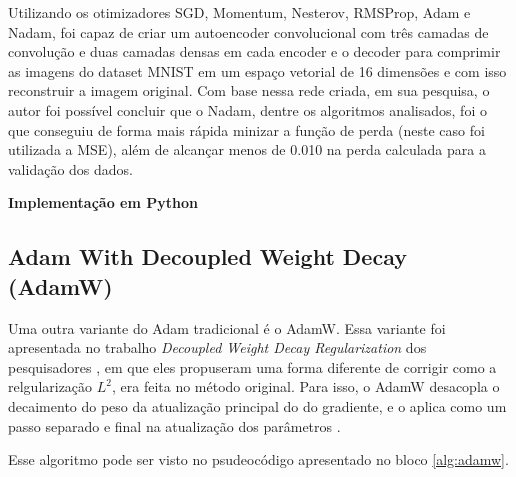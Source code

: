 Utilizando os otimizadores SGD, Momentum, Nesterov, RMSProp, Adam e Nadam, \textcite{NadamMethod} foi capaz de criar um autoencoder convolucional com três camadas de convolução e duas camadas densas em cada encoder e o decoder para comprimir as imagens do dataset MNIST em um espaço vetorial de 16 dimensões e com isso reconstruir a imagem original. Com base nessa rede criada, em sua pesquisa, o autor foi possível concluir que o Nadam, dentre os algoritmos analisados, foi o que conseguiu de forma mais rápida minizar a função de perda (neste caso foi utilizada a MSE), além de alcançar menos de 0.010 na perda calculada para a validação dos dados.

\textbf{Implementação em Python}

\subsection{Adam With Decoupled Weight Decay (AdamW)}

Uma outra variante do Adam tradicional é o AdamW. Essa variante foi apresentada no trabalho \textit{Decoupled Weight Decay Regularization} dos pesquisadores \textcite{AdamWMethod}, em que eles propuseram uma forma diferente de corrigir como a relgularização $L^2$, era feita no método original. Para isso, o AdamW desacopla o decaimento do peso da atualização principal do do gradiente, e o aplica como um passo separado e final na atualização dos parâmetros \parencite{AdamWMethod}.

Esse algoritmo pode ser visto no psudeocódigo apresentado no bloco \ref{alg:adamw}.

